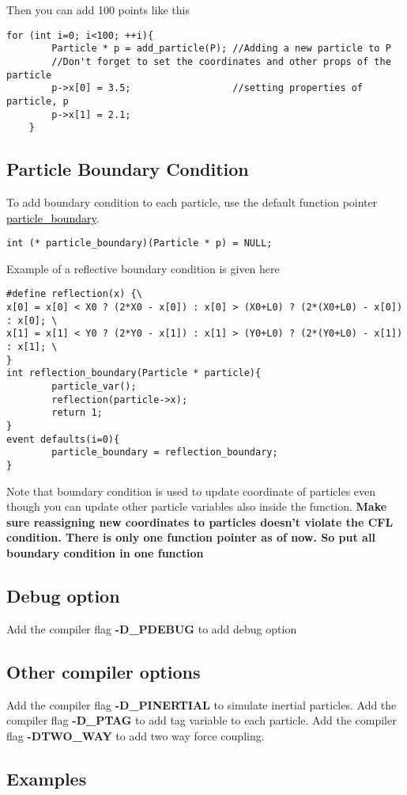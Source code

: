 \documentclass[a4paper,12pt]{article}
\newcommand{\fname}[1]{\textcolor{black}{\underline{#1}}}
\begin{document}
    Then you can add 100 points like this
    \begin{lstlisting}[style=CStyle]
    for (int i=0; i<100; ++i){
        Particle * p = add_particle(P); //Adding a new particle to P
        //Don't forget to set the coordinates and other props of the particle
        p->x[0] = 3.5;                  //setting properties of particle, p
        p->x[1] = 2.1;
    }
    \end{lstlisting}
    
    \subsection{Particle Boundary Condition}
    To add boundary condition to each particle, use the default function pointer \fname{particle\_boundary}. 
    \begin{lstlisting}[style=CStyle]
int (* particle_boundary)(Particle * p) = NULL;
    \end{lstlisting}
    
    
    Example of a reflective boundary condition is given here
    \begin{lstlisting}[style=CStyle]
#define reflection(x) {\                                                                            
x[0] = x[0] < X0 ? (2*X0 - x[0]) : x[0] > (X0+L0) ? (2*(X0+L0) - x[0]) : x[0]; \       
x[1] = x[1] < Y0 ? (2*Y0 - x[1]) : x[1] > (Y0+L0) ? (2*(Y0+L0) - x[1]) : x[1]; \       
}
int reflection_boundary(Particle * particle){
        particle_var();
        reflection(particle->x);
        return 1;
}
event defaults(i=0){
        particle_boundary = reflection_boundary;
}
    \end{lstlisting}
    Note that boundary condition is used to update coordinate of particles even though you can update other particle variables also inside the function. 
    \textbf{Make sure reassigning new coordinates to particles doesn't violate the CFL condition. There is only one function pointer as of now. So put all boundary condition in one function}
    
    \subsection{Debug option}
    Add the compiler flag \textbf{-D\_PDEBUG} to add debug option
    
    
    
    
    \subsection{Other compiler options}
    Add the compiler flag \textbf{-D\_PINERTIAL} to simulate inertial particles.
    Add the compiler flag \textbf{-D\_PTAG} to add tag variable to each particle.
    Add the compiler flag \textbf{-DTWO\_WAY} to add two way force coupling.

    
    \subsection{Examples}
    
    
    
\end{document}
